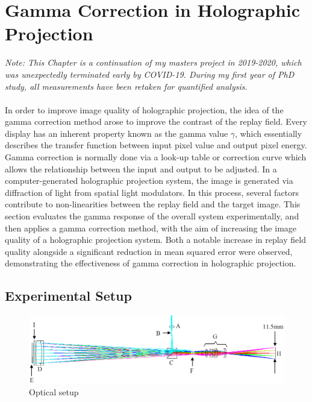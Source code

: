 \chapter{Gamma Correction in Holographic Projection} \label{sec:Gamma Correction in Holographic Projection}

\graphicspath{{Chapter3/Figs/}}

\textit{Note: This Chapter is a continuation of my masters project in 2019-2020, which was unexpectedly terminated early by COVID-19. During my first year of PhD study, all measurements have been retaken for quantified analysis.}\\\\
In order to improve image quality of holographic projection, the idea of the gamma correction method arose to improve the contrast of the replay field. Every display has an inherent property known as the gamma value $\gamma$, which essentially describes the transfer function between input pixel value and output pixel energy\cite{Gonzalez2002}. Gamma correction is normally done via a look-up table or correction curve which allows the relationship between the input and output to be adjusted. In a computer-generated holographic projection system, the image is generated via diffraction of light from spatial light modulators. In this process, several factors contribute to non-linearities between the replay field and the target image. This section evaluates the gamma response of the overall system experimentally, and then applies a gamma correction method, with the aim of increasing the image quality of a holographic projection system. Both a notable increase in replay field quality alongside a significant reduction in mean squared error were observed, demonstrating the effectiveness of gamma correction in holographic projection.


\section{Experimental Setup}\label{sec:Experimental Setup}
\begin{figure}[H]
  \centering
  \includegraphics[width=1.0\textwidth]{projection_setup.png}
  \caption{Optical setup \cite{Freeman2009}}
  \label{fig:projection_setup}
\end{figure}

